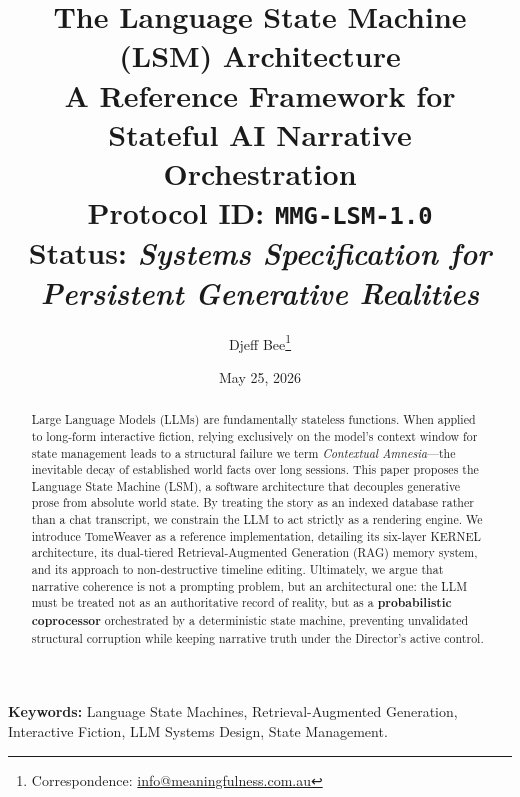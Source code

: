 \documentclass[12pt, a4paper]{article}
\title{
    \Large \textbf{The Language State Machine (LSM) Architecture} \\
    \large A Reference Framework for Stateful AI Narrative Orchestration \\
    \vspace{1em}
    \small Protocol ID: \texttt{MMG-LSM-1.0} \\
    \small \textbf{Status:} \textit{Systems Specification for Persistent Generative Realities}
}
\author{\vspace{0.8em}Djeff Bee\thanks{Correspondence: \href{mailto:info@meaningfulness.com.au}{info@meaningfulness.com.au}}}
\affil{\vspace{-0.5em}\textit{Principal Architect, Meaningfulness Media Group}}
\date{\vspace{-0.5em}May 25, 2026}
\begin{document}
\maketitle
\vspace{-2em}

\thispagestyle{fancy}
\fancyhf{}
\renewcommand{\headrulewidth}{0pt}

\begin{abstract}
\noindent
Large Language Models (LLMs) are fundamentally stateless functions. When applied to long-form interactive fiction, relying exclusively on the model's context window for state management leads to a structural failure we term \textit{Contextual Amnesia}---the inevitable decay of established world facts over long sessions. This paper proposes the Language State Machine (LSM), a software architecture that decouples generative prose from absolute world state. By treating the story as an indexed database rather than a chat transcript, we constrain the LLM to act strictly as a rendering engine. We introduce TomeWeaver as a reference implementation, detailing its six-layer KERNEL architecture, its dual-tiered Retrieval-Augmented Generation (RAG) memory system, and its approach to non-destructive timeline editing. Ultimately, we argue that narrative coherence is not a prompting problem, but an architectural one: the LLM must be treated not as an authoritative record of reality, but as a \textbf{probabilistic coprocessor} orchestrated by a deterministic state machine, preventing unvalidated structural corruption while keeping narrative truth under the Director's active control.
\end{abstract}

\vspace{0.5em}
\noindent\textbf{Keywords:} Language State Machines, Retrieval-Augmented Generation, Interactive Fiction, LLM Systems Design, State Management.

\vspace{1em}
\noindent
{}
\end{document}

